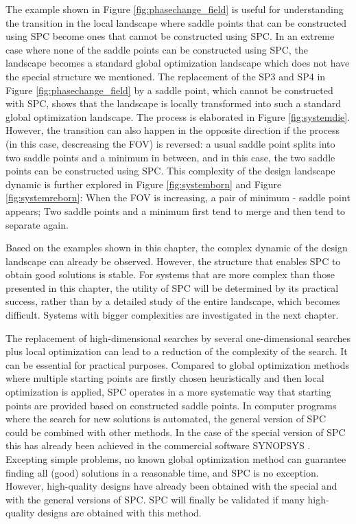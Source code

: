 The example shown in Figure \ref{fig:phasechange_field} is useful for understanding the transition in the local landscape where saddle points that can be constructed using SPC become ones that cannot be constructed using SPC. In an extreme case where none of the saddle points can be constructed using SPC, the landscape becomes a standard global optimization landscape which does not have the special structure we mentioned. The replacement of the SP3 and SP4 in Figure \ref{fig:phasechange_field} by a saddle point, which cannot be constructed with SPC, shows that the landscape is locally transformed into such a standard global optimization landscape. The process is elaborated in Figure \ref{fig:systemdie}. However, the transition can also happen in the opposite direction if the process (in this case, descreasing the FOV) is reversed: a usual saddle point splits into two saddle points and a minimum in between, and in this case, the two saddle points can be constructed using SPC. This complexity of the design landscape dynamic is further explored in Figure \ref{fig:systemborn} and Figure \ref{fig:systemreborn}: When the FOV is increasing, a pair of minimum - saddle point appears; Two saddle points and a minimum first tend to merge and then tend to separate again. 

Based on the examples shown in this chapter, the complex dynamic of the design landscape can already be observed. However, the structure that enables SPC to obtain good solutions is stable. For systems that are more complex than those presented in this chapter, the utility of SPC will be determined by its practical success, rather than by a detailed study of the entire landscape, which becomes difficult. Systems with bigger complexities are investigated in the next chapter. 

The replacement of high-dimensional searches by several one-dimensional searches plus local optimization can lead to a reduction of the complexity of the search. It can be essential for practical purposes. Compared to global optimization methods where multiple starting points are firstly chosen heuristically and then local optimization is applied, SPC operates in a more systematic way that starting points are provided based on constructed saddle points. In computer programs where the search for new solutions is automated, the general version of SPC could be combined with other methods. In the case of the special version of SPC this has already been achieved in the commercial software SYNOPSYS \cite{DilworthSP2012}. Excepting simple problems, no known global optimization method can guarantee finding all (good) solutions in a reasonable time, and SPC is no exception. However, high-quality designs have already been obtained with the special \cite{MarinescuSP2008}\cite{BociortPatent2010} and with the general versions \cite{LivshitsSP2014} of SPC. SPC will finally be validated if many high-quality designs are obtained with this method.

